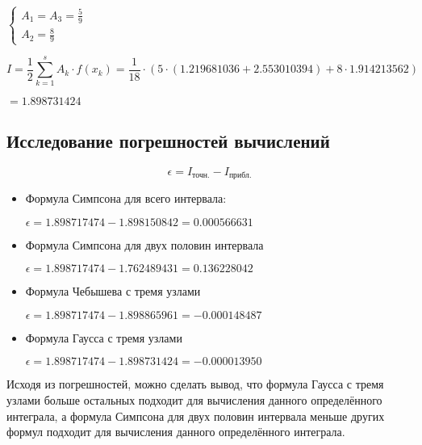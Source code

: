 $
 \begin{cases}
   A_1 = A_3 = \frac{5}{9}
   \\
   A_2 = \frac{8}{9}
 \end{cases}
$

\begin{displaymath}
I = \frac{1}{2} \sum_{k=1}^{s} A_k \cdot f(x_k) = \frac{1}{18} \cdot (5 \cdot (1.219681036 + 2.553010394) + 8 \cdot 1.914213562)
\end{displaymath}

$ = 1.898731424$

\subsection{Исследование погрешностей вычислений}

\begin{displaymath}
\epsilon = I_\text{точн.} - I_\text{прибл.}
\end{displaymath}

\begin{itemize}

\item Формула Симпсона для всего интервала:

$\epsilon = 1.898717474 - 1.898150842 = 0.000566631$

\item Формула Симпсона для двух половин интервала

$\epsilon = 1.898717474 - 1.762489431 = 0.136228042$

\item Формула Чебышева с тремя узлами

$\epsilon = 1.898717474 - 1.898865961 = -0.000148487$

\item Формула Гаусса с тремя узлами

$\epsilon = 1.898717474 - 1.898731424 = -0.000013950$

\end{itemize}

Исходя из погрешностей, можно сделать вывод, что формула Гаусса с тремя узлами больше остальных подходит для вычисления данного определённого интеграла, а формула Симпсона для двух половин интервала меньше других формул подходит для вычисления данного определённого интеграла. 


